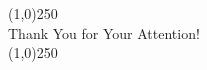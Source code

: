 \begin{frame}
\vspace{3em}
    \centering 
    \line(1,0){250}\\
    \vspace{1em}
    {\Large Thank You for Your Attention!}\\
    \line(1,0){250}
\end{frame}


